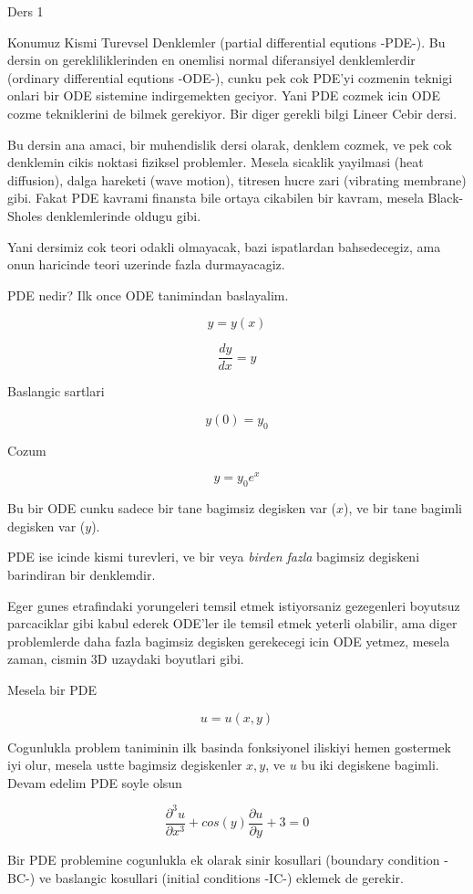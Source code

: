 \documentclass[12pt,fleqn]{article}
\begin{document}
Ders 1

Konumuz Kismi Turevsel Denklemler (partial differential equtions -PDE-). Bu
dersin on gerekliliklerinden en onemlisi normal diferansiyel denklemlerdir
(ordinary differential equtions -ODE-), cunku pek cok PDE'yi cozmenin
teknigi onlari bir ODE sistemine indirgemekten geciyor. Yani PDE cozmek
icin ODE cozme tekniklerini de bilmek gerekiyor. Bir diger gerekli bilgi
Lineer Cebir dersi.

Bu dersin ana amaci, bir muhendislik dersi olarak, denklem cozmek, ve pek
cok denklemin cikis noktasi fiziksel problemler. Mesela sicaklik yayilmasi
(heat diffusion), dalga hareketi (wave motion), titresen hucre zari
(vibrating membrane) gibi. Fakat PDE kavrami finansta bile ortaya cikabilen
bir kavram, mesela Black-Sholes denklemlerinde oldugu gibi. 

Yani dersimiz cok teori odakli olmayacak, bazi ispatlardan bahsedecegiz,
ama onun haricinde teori uzerinde fazla durmayacagiz. 

PDE nedir? Ilk once ODE tanimindan baslayalim. 

\[ y = y(x) \]

\[ \frac{dy}{dx} = y \]

Baslangic sartlari 

\[ y(0) = y_0 \]

Cozum 

\[ y = y_0e^x \]

Bu bir ODE cunku sadece bir tane bagimsiz degisken var ($x$), ve bir tane
bagimli degisken var ($y$). 

PDE ise icinde kismi turevleri, ve bir veya {\em birden fazla} bagimsiz
degiskeni barindiran bir denklemdir.

Eger gunes etrafindaki yorungeleri temsil etmek istiyorsaniz gezegenleri
boyutsuz parcaciklar gibi kabul ederek ODE'ler ile temsil etmek yeterli
olabilir, ama diger problemlerde daha fazla bagimsiz degisken gerekecegi
icin ODE yetmez, mesela zaman, cismin 3D uzaydaki boyutlari gibi.

Mesela bir PDE

\[ u = u(x,y) \]

Cogunlukla problem taniminin ilk basinda fonksiyonel iliskiyi hemen
gostermek iyi olur, mesela ustte bagimsiz degiskenler $x,y$, ve $u$ bu iki
degiskene bagimli. Devam edelim PDE soyle olsun

\[ \frac{\partial^3 u}{\partial x^3} + 
cos(y)\frac{\partial u}{\partial y} + 3 = 0
\]

Bir PDE problemine cogunlukla ek olarak sinir kosullari (boundary condition
-BC-) ve baslangic kosullari (initial conditions -IC-) eklemek de gerekir. 
\end{document}
